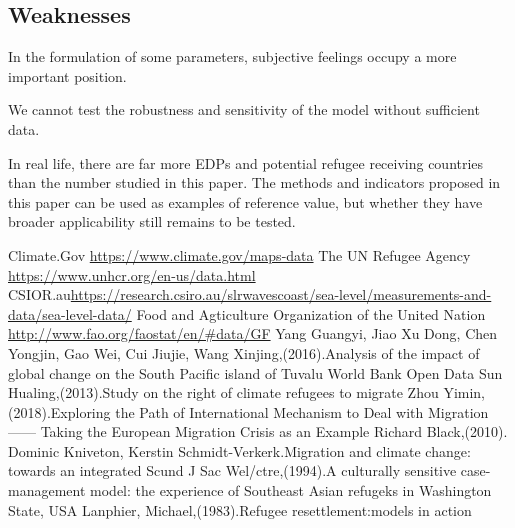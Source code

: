 \documentclass{mcmthesis}
\begin{document}
\subsection{Weaknesses}
In the formulation of some parameters, subjective feelings occupy a more important position.

We cannot test the robustness and sensitivity of the model without sufficient data.

In real life, there are far more EDPs and potential refugee receiving countries than the number studied in this paper. The methods and indicators proposed in this paper can be used as examples of reference value, but whether they have broader applicability still remains to be tested.







\begin{thebibliography}{99}%
 Climate.Gov \url{https://www.climate.gov/maps-data}
The UN Refugee Agency \url{https://www.unhcr.org/en-us/data.html}
CSIOR.au\enspace\url{https://research.csiro.au/slrwavescoast/sea-level/measurements-and-data/sea-level-data/}
Food and Agticulture Organization of the United Nation \url{http://www.fao.org/faostat/en/#data/GF}
Yang Guangyi, Jiao Xu Dong, Chen Yongjin, Gao Wei, Cui Jiujie, Wang Xinjing,(2016).Analysis of the impact of global change on the South Pacific island of Tuvalu
World Bank Open Data
Sun Hualing,(2013).Study on the right of climate refugees to migrate
Zhou Yimin,(2018).Exploring the Path of International Mechanism to Deal with Migration —— Taking the European Migration Crisis as an Example
Richard Black,(2010). Dominic Kniveton, Kerstin Schmidt-Verkerk.Migration and climate change: towards an integrated
Scund J Sac Wel/ctre,(1994).A culturally sensitive 
case-management model: 
the experience of Southeast Asian 
refugeks in Washington State, USA
Lanphier, Michael,(1983).Refugee resettlement:models in action
\end{thebibliography}
\end{document}
